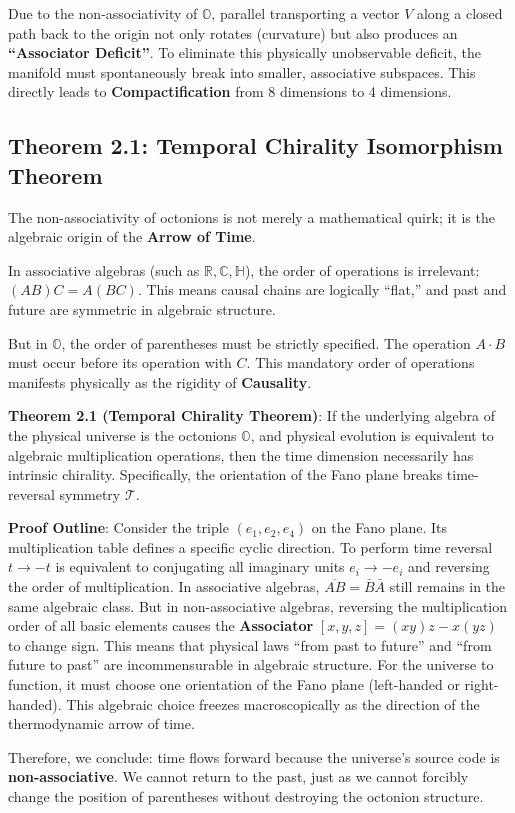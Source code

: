 Due to the non-associativity of $\mathbb{O}$, parallel transporting a vector $V$ along a closed path back to the origin not only rotates (curvature) but also produces an \textbf{``Associator Deficit''}. To eliminate this physically unobservable deficit, the manifold must spontaneously break into smaller, associative subspaces. This directly leads to \textbf{Compactification} from 8 dimensions to 4 dimensions.

\subsection{Theorem 2.1: Temporal Chirality Isomorphism Theorem}

The non-associativity of octonions is not merely a mathematical quirk; it is the algebraic origin of the \textbf{Arrow of Time}.

In associative algebras (such as $\mathbb{R}, \mathbb{C}, \mathbb{H}$), the order of operations is irrelevant: $(AB)C = A(BC)$. This means causal chains are logically ``flat,'' and past and future are symmetric in algebraic structure.

But in $\mathbb{O}$, the order of parentheses must be strictly specified. The operation $A \cdot B$ must occur before its operation with $C$. This mandatory order of operations manifests physically as the rigidity of \textbf{Causality}.

\textbf{Theorem 2.1 (Temporal Chirality Theorem)}:
If the underlying algebra of the physical universe is the octonions $\mathbb{O}$, and physical evolution is equivalent to algebraic multiplication operations, then the time dimension necessarily has intrinsic chirality. Specifically, the orientation of the Fano plane breaks time-reversal symmetry $\mathcal{T}$.

\textbf{Proof Outline}:
Consider the triple $(e_1, e_2, e_4)$ on the Fano plane. Its multiplication table defines a specific cyclic direction. To perform time reversal $t \to -t$ is equivalent to conjugating all imaginary units $e_i \to -e_i$ and reversing the order of multiplication.
In associative algebras, $\overline{AB} = \bar{B}\bar{A}$ still remains in the same algebraic class.
But in non-associative algebras, reversing the multiplication order of all basic elements causes the \textbf{Associator} $[x,y,z] = (xy)z - x(yz)$ to change sign.
This means that physical laws ``from past to future'' and ``from future to past'' are incommensurable in algebraic structure. For the universe to function, it must choose one orientation of the Fano plane (left-handed or right-handed). This algebraic choice freezes macroscopically as the direction of the thermodynamic arrow of time.

Therefore, we conclude: time flows forward because the universe's source code is \textbf{non-associative}. We cannot return to the past, just as we cannot forcibly change the position of parentheses without destroying the octonion structure.
